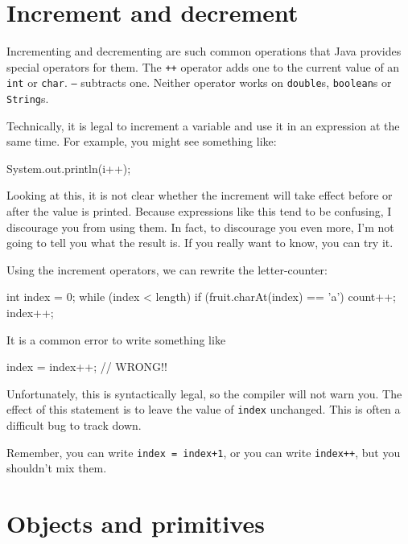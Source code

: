 \section{Increment and decrement}


Incrementing and decrementing are such common operations that Java provides special operators for them.
The {\tt ++} operator adds one to the current value of an {\tt int} or {\tt char}.
{\tt --} subtracts one.
Neither operator works on {\tt double}s, {\tt boolean}s or {\tt String}s.

Technically, it is legal to increment a variable and use it in an expression at the same time.
For example, you might see something like:

\begin{code}
    System.out.println(i++);
\end{code}

Looking at this, it is not clear whether the increment will take effect before or after the value is printed.
Because expressions like this tend to be confusing, I discourage you from using them.
In fact, to discourage you even more, I'm not going to tell you what the result is.
If you really want to know, you can try it.

Using the increment operators, we can rewrite the letter-counter:

\begin{code}
    int index = 0;
    while (index < length) {
        if (fruit.charAt(index) == 'a') {
            count++;
        }
        index++;
    }
\end{code}

It is a common error to write something like

\begin{code}
    index = index++;             // WRONG!!
\end{code}

Unfortunately, this is syntactically legal, so the compiler will not warn you.
The effect of this statement is to leave the value of {\tt index} unchanged.
This is often a difficult bug to track down.

Remember, you can write {\tt index = index+1}, or you can write {\tt index++}, but you shouldn't mix them.


\section{Objects and primitives}

